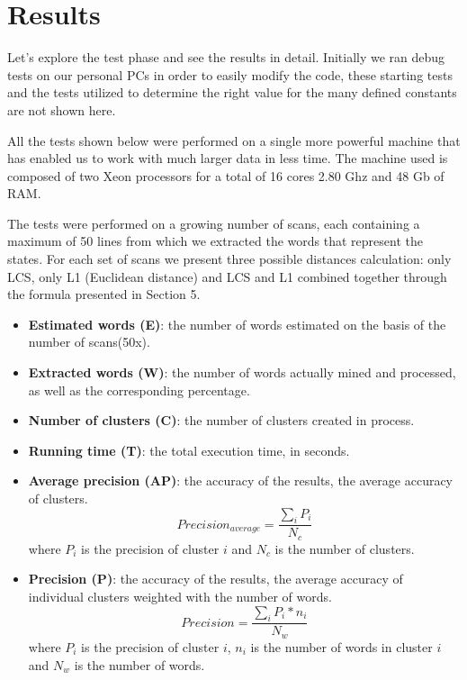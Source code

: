 \section{Results}

Let's explore the test phase and see the results in detail. Initially we ran debug tests on our personal PCs in order to easily modify the code, these starting tests and the tests utilized to determine the right value for the many defined constants are not shown here. 

All the tests shown below were performed on a single more powerful machine that has enabled us to work with much larger data in less time. The machine used is composed of two Xeon processors for a total of 16 cores 2.80 Ghz and 48 Gb of RAM.

The tests were performed on a growing number of scans, each containing a maximum of 50 lines from which we extracted the words that represent the states. For each set of scans we present three possible distances calculation: only LCS, only L1 (Euclidean distance) and LCS and L1 combined together through the formula presented in Section 5.

\vspace{3mm}

\begin{itemize}
\item \textbf{Estimated words (E)}: the number of words estimated on the basis of the number of scans(50x).
\item \textbf{Extracted words (W)}: the number of words actually mined and processed, as well as the corresponding percentage.
\item \textbf{Number of clusters (C)}: the number of clusters created in process.
\item \textbf{Running time (T)}: the total execution time, in seconds.
\item \textbf{Average precision (AP)}: the accuracy of the results, the average accuracy of clusters.
$$Precision_{average} = \frac{\sum_i P_i}{N_c}$$
where $P_i$ is the precision of cluster $i$ and $N_c$ is the number of clusters. 
\item \textbf{Precision (P)}: the accuracy of the results, the average accuracy of individual clusters weighted with the number of words.
$$Precision = \frac{\sum_i P_i * n_i}{N_w}$$
where $P_i$ is the precision of cluster $i$, $n_i$ is the number of words in cluster $i$ and $N_w$ is the number of words. 
\end{itemize}

